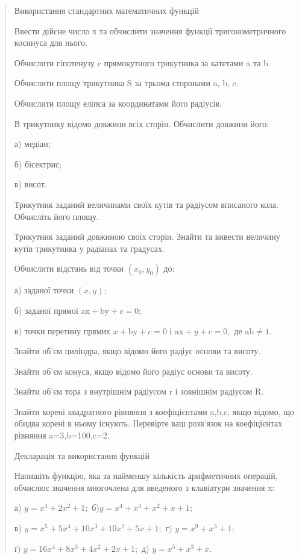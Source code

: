 \documentclass[]{article}
\begin{document}
\begin{quote}
Використання стандартних математичних функцій

Ввести дійсне число х та обчислити значення функції тригонометричного
косинуса для нього.

Обчислити гіпотенузу c прямокутного трикутника за катетами a та b.

Обчислити площу трикутника S за трьома сторонами a, b, c.

Обчислити площу еліпса за координатами його радіусів.

В трикутнику відомо довжини всіх сторін. Обчислити довжини його:

а) медіан;

б) бісектрис;

в) висот.

Трикутник заданий величинами своїх кутів та радіусом вписаного кола.
Обчисліть його площу.

Трикутник заданий довжиною своїх сторін. Знайти та вивести величину
кутів трикутника у радіанах та градусах.

Обчислити відстань від точки \(\left( x_{0},y_{0} \right)\) до:

а) заданої точки \(\left( x,y \right);\)

б) заданої прямої \(\mathrm{\text{ax}} + \mathrm{\text{by}} + c = 0\);

в) точки перетину прямих \(x + \mathrm{\text{by}} + c = 0\) і
\(\mathrm{\text{ax}} + y + c = 0,\) де
\(\mathrm{\text{ab}} \neq 1\mathrm{.}\)

Знайти об'єм циліндра, якщо відомо його радіус основи та висоту.

Знайти об'єм конуса, якщо відомо його радіус основи та висоту.

Знайти об'єм тора з внутрішнім радіусом r і зовнішнім радіусом R.

Знайти корені квадратного рівняння з коефіцієнтами a,b,c, якщо відомо,
що обидва корені в ньому існують. Перевірте ваш розв'язок на
коефіцієнтах рівняння a=3,b=100,c=2.

Декларація та використання функцій

Напишіть функцію, яка за найменшу кількість арифметичних операцій,
обчислює значення многочлена для введеного з клавіатури значення x:

а) \(y = x^{4} + 2x^{2} + 1;\) б)\(y = x^{4} + x^{3} + x^{2} + x + 1;\)

в)
\(y = x^{5} + 5x^{4} + \mathrm{10}x^{3} + \mathrm{10}x^{2} + 5x + 1;\)
г) \(y = x^{9} + x^{3} + 1;\)

ґ) \(y = \mathrm{16}x^{4} + 8x^{3} + 4x^{2} + 2x + 1;\) д)
\(y = x^{5} + x^{3} + x\mathrm{.}\)


\end{quote}
\end{document}
